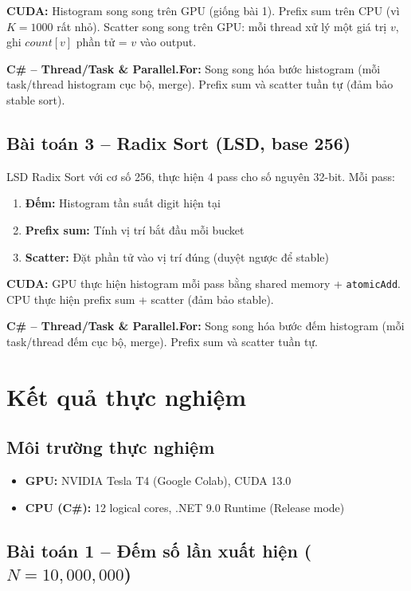 \documentclass[12pt,a4paper]{article}
\begin{document}
\textbf{CUDA:} Histogram song song trên GPU (giống bài 1). Prefix sum trên CPU (vì $K = 1000$ rất nhỏ). Scatter song song trên GPU: mỗi thread xử lý một giá trị $v$, ghi $count[v]$ phần tử = $v$ vào output.

\textbf{C\# -- Thread/Task \& Parallel.For:} Song song hóa bước histogram (mỗi task/thread histogram cục bộ, merge). Prefix sum và scatter tuần tự (đảm bảo stable sort).

\subsection{Bài toán 3 -- Radix Sort (LSD, base 256)}

LSD Radix Sort với cơ số 256, thực hiện 4 pass cho số nguyên 32-bit. Mỗi pass:
\begin{enumerate}[nosep]
    \item \textbf{Đếm:} Histogram tần suất digit hiện tại
    \item \textbf{Prefix sum:} Tính vị trí bắt đầu mỗi bucket
    \item \textbf{Scatter:} Đặt phần tử vào vị trí đúng (duyệt ngược để stable)
\end{enumerate}

\textbf{CUDA:} GPU thực hiện histogram mỗi pass bằng shared memory + \texttt{atomicAdd}. CPU thực hiện prefix sum + scatter (đảm bảo stable).

\textbf{C\# -- Thread/Task \& Parallel.For:} Song song hóa bước đếm histogram (mỗi task/thread đếm cục bộ, merge). Prefix sum và scatter tuần tự.

\section{Kết quả thực nghiệm}

\subsection{Môi trường thực nghiệm}
\begin{itemize}[nosep]
    \item \textbf{GPU:} NVIDIA Tesla T4 (Google Colab), CUDA 13.0
    \item \textbf{CPU (C\#):} 12 logical cores, .NET 9.0 Runtime (Release mode)
\end{itemize}

\subsection{Bài toán 1 -- Đếm số lần xuất hiện ($N = 10{,}000{,}000$)}
\end{document}
